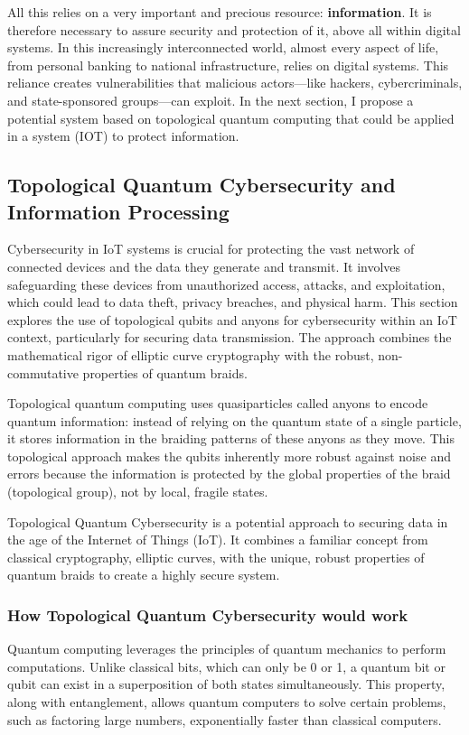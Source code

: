 \documentclass{article}
\begin{document}
All this relies on a very important and precious resource: \textbf{information}. It is therefore necessary to assure security and protection of it, above all within digital systems.
In this increasingly interconnected world, almost every aspect of life, from personal banking to national infrastructure, relies on digital systems. This reliance creates vulnerabilities that malicious actors—like hackers, cybercriminals, and state-sponsored groups—can exploit. In the next section, I propose a potential system based on topological quantum computing that could be applied in a system (IOT) to protect information.
\newpage
\subsection{Topological Quantum Cybersecurity and Information Processing}
Cybersecurity in IoT systems is crucial for protecting the vast network of connected devices and the data they generate and transmit. It involves safeguarding these devices from unauthorized access, attacks, and exploitation, which could lead to data theft, privacy breaches, and physical harm.
This section explores the use of topological qubits and anyons for cybersecurity within an IoT context, particularly for securing data transmission. The approach combines the mathematical rigor of elliptic curve cryptography with the robust, non-commutative properties of quantum braids.

Topological quantum computing uses quasiparticles called anyons to encode quantum information: instead of relying on the quantum state of a single particle, it stores information in the braiding patterns of these anyons as they move. This topological approach makes the qubits inherently more robust against noise and errors because the information is protected by the global properties of the braid (topological group), not by local, fragile states.

Topological Quantum Cybersecurity is a potential approach to securing data in the age of the Internet of Things (IoT). It combines a familiar concept from classical cryptography, elliptic curves, with the unique, robust properties of quantum braids to create a highly secure system.

\subsubsection*{How Topological Quantum Cybersecurity would work}
Quantum computing leverages the principles of quantum mechanics to perform computations. Unlike classical bits, which can only be 0 or 1, a quantum bit or qubit can exist in a superposition of both states simultaneously. This property, along with entanglement, allows quantum computers to solve certain problems, such as factoring large numbers, exponentially faster than classical computers.
\end{document}
